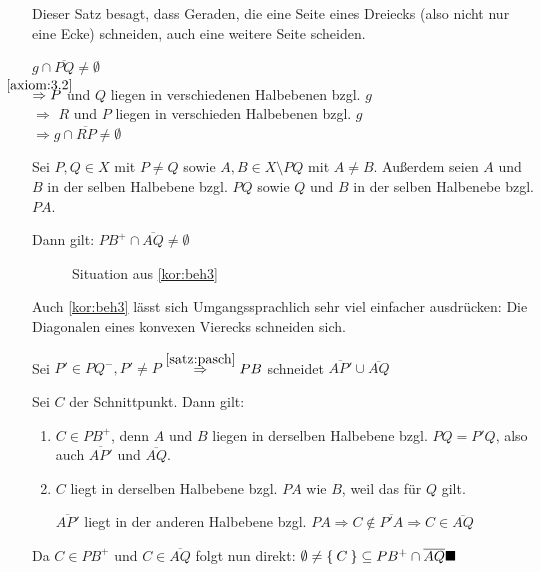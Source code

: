 Dieser Satz besagt, dass Geraden, die eine Seite eines Dreiecks 
(also nicht nur eine Ecke) schneiden, auch eine weitere Seite 
scheiden.

\begin{beweis}
    $g \cap \overline{PQ} \neq \emptyset$\\
    $\overset{\mathclap{\ref{axiom:3.2}}}{\Rightarrow} P$ und $Q$ liegen in verschiedenen Halbebenen bzgl. $g$\\
    $\Rightarrow$ \obda $R$ und $P$ liegen in verschieden
    Halbebenen bzgl. $g$\\
    $\Rightarrow g \cap \overline{RP} \neq \emptyset$
\end{beweis}

\begin{bemerkung}\label{kor:beh3}
    Sei $P, Q \in X$ mit $P \neq Q$ sowie $A, B \in X \setminus PQ$ 
    mit $A \neq B$.
    Außerdem seien $A$ und $B$ in der selben Halbebene bzgl. $PQ$ sowie
    $Q$ und $B$ in der selben Halbenebe bzgl. $PA$.

    Dann gilt: $PB^+ \cap \overline{AQ} \neq \emptyset$
\end{bemerkung}

\begin{figure}[htp]
    \centering
    
    \caption{Situation aus \cref{kor:beh3}}
    \label{fig:bild-5}
\end{figure}

Auch \cref{kor:beh3} lässt sich Umgangssprachlich sehr viel 
einfacher ausdrücken: Die Diagonalen eines konvexen Vierecks 
schneiden sich.

\begin{beweis}%
    Sei $P' \in PQ^-, P' \neq P$
    $\overset{\cref{satz:pasch}}{\Rightarrow} PB$ schneidet
    $\overline{AP'} \cup \overline{AQ}$

    Sei $C$ der Schnittpunkt. Dann gilt:
    \begin{enumerate}[label=(\roman*)]
        \item $C \in PB^+$, denn $A$ und $B$ liegen in derselben
              Halbebene bzgl. $PQ = P'Q$, also auch
              $\overline{AP'}$ und $\overline{AQ}$.
        \item $C$ liegt in derselben Halbebene bzgl. $PA$ wie
              $B$, weil das für $Q$ gilt.

              $\overline{AP'}$ liegt in der anderen Halbebene
              bzgl. $PA \Rightarrow C \notin \overline{P'A} \Rightarrow C \in \overline{AQ}$
    \end{enumerate}
    Da $C \in PB^+$ und $C \in \overline{AQ}$ folgt nun direkt: 
    $\emptyset \neq \Set{C} \subseteq PB^+ \cap \overline{AQ} \qed$
\end{beweis}

